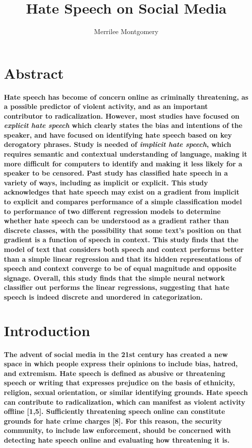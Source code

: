 \documentclass{article}
\title{Hate Speech on Social Media}
\author{Merrilee Montgomery}
\begin{document}
\maketitle
\section{Abstract}
\paragraph{Hate speech has become of concern online as criminally threatening, as a possible predictor of violent activity, and as an important contributor to radicalization. However, most studies have focused on \textit{explicit hate speech} which clearly states the bias and intentions of the speaker, and have focused on identifying hate speech based on key derogatory phrases. Study is needed of \textit{implicit hate speech}, which requires semantic and contextual understanding of language, making it more difficult for computers to identify and making it less likely for a speaker to be censored. Past study has classified hate speech in a variety of ways, including as implicit or explicit. This study acknowledges that hate speech may exist on a gradient from implicit to explicit and compares performance of a simple classification model to performance of two different regression models to determine whether hate speech can be understood as a gradient rather than discrete classes, with the possibility that some text's position on that gradient is a function of speech in context. This study finds that the model of text that considers both speech and context performs better than a simple linear regression and that its hidden representations of speech and context converge to be of equal magnitude and opposite signage. Overall, this study finds that the simple neural network classifier out performs the linear regressions, suggesting that hate speech is indeed discrete and unordered in categorization.}
\section{Introduction}
\paragraph{The advent of social media in the 21st century has created a new space in which people express their opinions to include bias, hatred, and extremism. Hate speech is defined as abusive or threatening speech or writing that expresses prejudice on the basis of ethnicity, religion, sexual orientation, or similar identifying grounds. Hate speech can contribute to radicalization, which can manifest as violent activity offline [1,5]. Sufficiently threatening speech online can constitute grounds for hate crime charges [8]. For this reason, the security community, to include law enforcement, should be concerned with detecting hate speech online and evaluating how threatening it is.}
\end{document}
